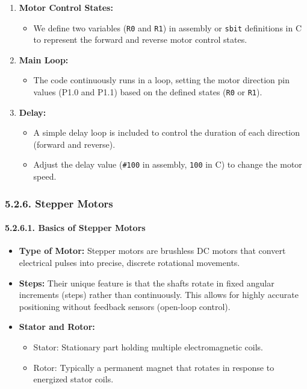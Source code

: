 \documentclass[
]{article}
\begin{document}
\begin{enumerate}
\def\labelenumi{\arabic{enumi}.}
\item
  \textbf{Motor Control States:}

  \begin{itemize}
  \item
    We define two variables (\texttt{R0} and \texttt{R1}) in assembly or
    \texttt{sbit} definitions in C to represent the forward and reverse
    motor control states.
  \end{itemize}
\item
  \textbf{Main Loop:}

  \begin{itemize}
  \item
    The code continuously runs in a loop, setting the motor direction
    pin values (P1.0 and P1.1) based on the defined states (\texttt{R0}
    or \texttt{R1}).
  \end{itemize}
\item
  \textbf{Delay:}

  \begin{itemize}
  \item
    A simple delay loop is included to control the duration of each
    direction (forward and reverse).
  \item
    Adjust the delay value (\texttt{\#100} in assembly, \texttt{100} in
    C) to change the motor speed.
  \end{itemize}
\end{enumerate}

\hypertarget{526-stepper-motors}{%
\subsubsection{5.2.6. Stepper Motors}\label{526-stepper-motors}}

\hypertarget{5261-basics-of-stepper-motors}{%
\paragraph{5.2.6.1. Basics of Stepper
Motors}\label{5261-basics-of-stepper-motors}}

\begin{itemize}
\item
  \textbf{Type of Motor:} Stepper motors are brushless DC motors that
  convert electrical pulses into precise, discrete rotational movements.
\item
  \textbf{Steps:} Their unique feature is that the shafts rotate in
  fixed angular increments (steps) rather than continuously. This allows
  for highly accurate positioning without feedback sensors (open-loop
  control).
\item
  \textbf{Stator and Rotor:}

  \begin{itemize}
  \item
    Stator: Stationary part holding multiple electromagnetic coils.
  \item
    Rotor: Typically a permanent magnet that rotates in response to
    energized stator coils.
  \end{itemize}
\end{itemize}
\end{document}
